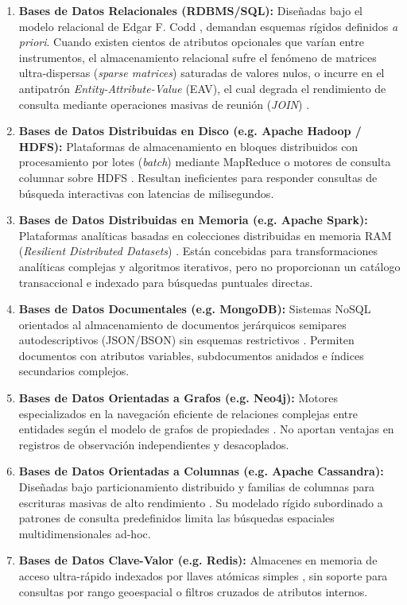 \documentclass[10pt]{article}
\begin{document}
\begin{enumerate}
    \item \textbf{Bases de Datos Relacionales (RDBMS/SQL):} Diseñadas bajo el modelo relacional de Edgar F. Codd \cite{codd1970relational}, demandan esquemas rígidos definidos \textit{a priori}. Cuando existen cientos de atributos opcionales que varían entre instrumentos, el almacenamiento relacional sufre el fenómeno de matrices ultra-dispersas (\textit{sparse matrices}) saturadas de valores nulos, o incurre en el antipatrón \textit{Entity-Attribute-Value} (EAV), el cual degrada el rendimiento de consulta mediante operaciones masivas de reunión (\textit{JOIN}) \cite{celko2014sql}.
    \item \textbf{Bases de Datos Distribuidas en Disco (e.g. Apache Hadoop / HDFS):} Plataformas de almacenamiento en bloques distribuidos con procesamiento por lotes (\textit{batch}) mediante MapReduce o motores de consulta columnar sobre HDFS \cite{white2012hadoop}. Resultan ineficientes para responder consultas de búsqueda interactivas con latencias de milisegundos.
    \item \textbf{Bases de Datos Distribuidas en Memoria (e.g. Apache Spark):} Plataformas analíticas basadas en colecciones distribuidas en memoria RAM (\textit{Resilient Distributed Datasets}) \cite{zaharia2016apache}. Están concebidas para transformaciones analíticas complejas y algoritmos iterativos, pero no proporcionan un catálogo transaccional e indexado para búsquedas puntuales directas.
    \item \textbf{Bases de Datos Documentales (e.g. MongoDB):} Sistemas NoSQL orientados al almacenamiento de documentos jerárquicos semipares autodescriptivos (JSON/BSON) sin esquemas restrictivos \cite{chodorow2013mongodb}. Permiten documentos con atributos variables, subdocumentos anidados e índices secundarios complejos.
    \item \textbf{Bases de Datos Orientadas a Grafos (e.g. Neo4j):} Motores especializados en la navegación eficiente de relaciones complejas entre entidades según el modelo de grafos de propiedades \cite{robinson2015graph}. No aportan ventajas en registros de observación independientes y desacoplados.
    \item \textbf{Bases de Datos Orientadas a Columnas (e.g. Apache Cassandra):} Diseñadas bajo particionamiento distribuido y familias de columnas para escrituras masivas de alto rendimiento \cite{lakshman2010cassandra}. Su modelado rígido subordinado a patrones de consulta predefinidos limita las búsquedas espaciales multidimensionales ad-hoc.
    \item \textbf{Bases de Datos Clave-Valor (e.g. Redis):} Almacenes en memoria de acceso ultra-rápido indexados por llaves atómicas simples \cite{carlson2013redis}, sin soporte para consultas por rango geoespacial o filtros cruzados de atributos internos.
\end{enumerate}
\end{document}
